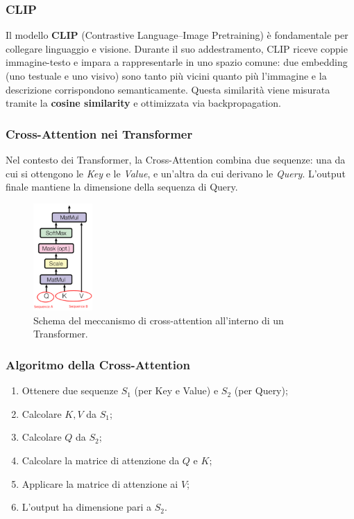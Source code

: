 \subsubsection{CLIP}
Il modello \textbf{CLIP} (Contrastive Language–Image Pretraining) è fondamentale per collegare linguaggio e visione. Durante il suo addestramento, CLIP riceve coppie immagine-testo e impara a rappresentarle in uno spazio comune: due embedding (uno testuale e uno visivo) sono tanto più vicini quanto più l’immagine e la descrizione corrispondono semanticamente. Questa similarità viene misurata tramite la \textbf{cosine similarity} e ottimizzata via backpropagation.

\subsubsection{Cross-Attention nei Transformer}

Nel contesto dei Transformer, la Cross-Attention combina due sequenze: una da cui si ottengono le \textit{Key} e le \textit{Value}, e un’altra da cui derivano le \textit{Query}. L’output finale mantiene la dimensione della sequenza di Query.

\begin{figure}
    \centering
    \includegraphics[width=0.2\textwidth]{figure/CrossTrasformer.png}
    \caption{Schema del meccanismo di cross-attention all'interno di un Transformer.}
    \label{fig:crossTrasf}
\end{figure}

\subsubsection{Algoritmo della Cross-Attention}

\begin{enumerate}
    \item Ottenere due sequenze $S_1$ (per Key e Value) e $S_2$ (per Query);
    \item Calcolare $K, V$ da $S_1$;
    \item Calcolare $Q$ da $S_2$;
    \item Calcolare la matrice di attenzione da $Q$ e $K$;
    \item Applicare la matrice di attenzione ai $V$;
    \item L’output ha dimensione pari a $S_2$.
\end{enumerate}

